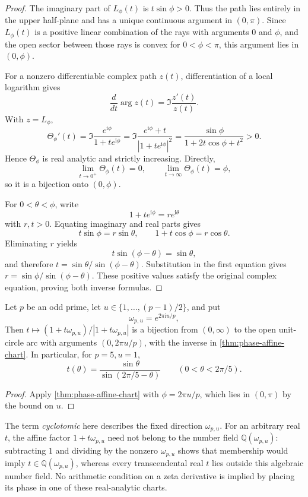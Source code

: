 \begin{proof}
The imaginary part of \(L_\phi(t)\) is \(t\sin\phi>0\).  Thus the path lies
entirely in the upper half-plane and has a unique continuous argument in
\((0,\pi)\).  Since \(L_\phi(t)\) is a positive linear combination of the rays
with arguments \(0\) and \(\phi\), and the open sector between those rays is
convex for \(0<\phi<\pi\), this argument lies in \((0,\phi)\).

For a nonzero differentiable complex path \(z(t)\), differentiation of a local
logarithm gives
\[
 \frac{d}{dt}\arg z(t)=\Im\frac{z'(t)}{z(t)}.
\]
With \(z=L_\phi\),
\[
 \Theta_\phi'(t)
 =
 \Im\frac{e^{\mathrm i\phi}}{1+te^{\mathrm i\phi}}
 =
 \Im\frac{e^{\mathrm i\phi}+t}
 {|1+te^{\mathrm i\phi}|^2}
 =
 \frac{\sin\phi}{1+2t\cos\phi+t^2}>0.
\]
Hence \(\Theta_\phi\) is real analytic and strictly increasing.  Directly,
\[
 \lim_{t\to0^+}\Theta_\phi(t)=0,
 \qquad
 \lim_{t\to\infty}\Theta_\phi(t)=\phi,
\]
so it is a bijection onto \((0,\phi)\).

For \(0<\theta<\phi\), write
\[
 1+te^{\mathrm i\phi}=re^{\mathrm i\theta}
\]
with \(r,t>0\).  Equating imaginary and real parts gives
\[
 t\sin\phi=r\sin\theta,
 \qquad
 1+t\cos\phi=r\cos\theta.
\]
Eliminating \(r\) yields
\[
 t\sin(\phi-\theta)=\sin\theta,
\]
and therefore \(t=\sin\theta/\sin(\phi-\theta)\).  Substitution in the first
equation gives \(r=\sin\phi/\sin(\phi-\theta)\).  These positive values satisfy
the original complex equation, proving both inverse formulas.
\end{proof}

\begin{corollary}
\label{cor:phase-cyclotomic-direction}
Let \(p\) be an odd prime, let
\(u\in\{1,\ldots,(p-1)/2\}\), and put
\[
 \omega_{p,u}=e^{2\pi\mathrm iu/p},
\]
Then \(t\mapsto(1+t\omega_{p,u})/|1+t\omega_{p,u}|\) is a bijection from
\((0,\infty)\) to the open unit-circle arc with arguments
\((0,2\pi u/p)\), with the inverse in
\cref{thm:phase-affine-chart}.  In particular, for \(p=5,u=1\),
\[
 t(\theta)=\frac{\sin\theta}{\sin(2\pi/5-\theta)}
 \qquad(0<\theta<2\pi/5).
\]
\end{corollary}

\begin{proof}
Apply \cref{thm:phase-affine-chart} with \(\phi=2\pi u/p\), which lies in
\((0,\pi)\) by the bound on \(u\).
\end{proof}

The term \emph{cyclotomic} here describes the fixed direction
\(\omega_{p,u}\).  For an arbitrary real \(t\), the affine factor
\(1+t\omega_{p,u}\) need not belong to the number field
\(\mathbb Q(\omega_{p,u})\): subtracting \(1\) and dividing by the nonzero
\(\omega_{p,u}\) shows that membership would imply
\(t\in\mathbb Q(\omega_{p,u})\), whereas every transcendental real \(t\) lies
outside this algebraic number field.  No arithmetic condition on a zeta
derivative is implied by placing its phase in one of these real-analytic charts.
